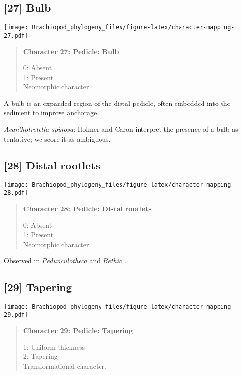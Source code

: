 \documentclass[openany]{book}
\theoremstyle{definition}
\theoremstyle{definition}
\theoremstyle{definition}
\theoremstyle{remark}
\begin{document}
\subsection*{{[}27{]} Bulb}\label{bulb}

\texttt{[image: Brachiopod\_phylogeny\_files/figure-latex/character-mapping-27.pdf]}

\begin{quote}
\textbf{Character 27: Pedicle: Bulb}

0: Absent\\
1: Present\\
Neomorphic character.
\end{quote}

A bulb is an expanded region of the distal pedicle, often embedded into
the sediment to improve anchorage.

\hypertarget{Acanthotretella_spinosa-coding-27}{}
\emph{Acanthotretella spinosa}: Holmer and Caron
\citeyearpar{Holmer2006Aspinose} interpret the presence of a bulb as
tentative; we score it as ambiguous.

\subsection*{{[}28{]} Distal rootlets}\label{distal-rootlets}

\texttt{[image: Brachiopod\_phylogeny\_files/figure-latex/character-mapping-28.pdf]}

\begin{quote}
\textbf{Character 28: Pedicle: Distal rootlets}

0: Absent\\
1: Present\\
Neomorphic character.
\end{quote}

Observed in \emph{Pedunculotheca} and \emph{Bethia}
\citep{Sutton2005Silurianbrachiopods}.

\subsection*{{[}29{]} Tapering}\label{tapering}

\texttt{[image: Brachiopod\_phylogeny\_files/figure-latex/character-mapping-29.pdf]}

\begin{quote}
\textbf{Character 29: Pedicle: Tapering}

1: Uniform thickness\\
2: Tapering\\
Transformational character.
\end{quote}
\end{document}
